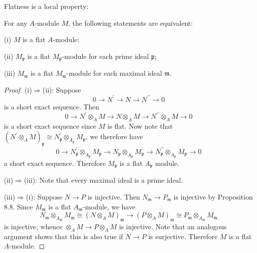 Flatness is a local property: 
\begin{proposition}
For any $A$-module $M$, the following statements are equivalent: \par
(i) $M$ is a flat $A$-module;\par
(ii) $M_\mathfrak{p}$ is a flat $M_\mathfrak{p}$-module for each prime ideal $\mathfrak{p}$;\par
(iii) $M_\mathfrak{m}$ is a flat $M_\mathfrak{m}$-module for each maximal ideal $\mathfrak{m}$.
\end{proposition}
\begin{proof}
(i)$\Rightarrow$(ii): Suppose 
$$
0\longrightarrow N^{\prime}\longrightarrow N\longrightarrow N^{\prime\prime}\longrightarrow 0
$$
is a short exact sequence. Then 
$$
0\longrightarrow N^{\prime}\otimes _AM\longrightarrow N\otimes _AM\longrightarrow N^{\prime\prime}\otimes _AM\longrightarrow 0
$$
is a short exact sequence since $M$ is flat. Now note that $\left( N^{\prime}\otimes _AM \right) _{\mathfrak{p}}\cong N_{\mathfrak{p}}^{\prime}\otimes _{A_{\mathfrak{p}}}M_{\mathfrak{p}}$, we therefore have 
$$
0\longrightarrow N_{\mathfrak{p}}^{\prime}\otimes _{A_{\mathfrak{p}}}M_{\mathfrak{p}}\longrightarrow N_{\mathfrak{p}}\otimes _{A_{\mathfrak{p}}}M_{\mathfrak{p}}\longrightarrow N_{\mathfrak{p}}^{\prime\prime}\otimes _{A_{\mathfrak{p}}}M_{\mathfrak{p}}\longrightarrow 0
$$
a short exact sequence. Therefore $M_\mathfrak{p}$ is a flat $A_\mathfrak{p}$ module.\par
(ii)$\Rightarrow$(iii): Note that every maximal ideal is a prime ideal.\par
(iii)$\Rightarrow$(i): Suppose $N\to P$ is injective. Then $N_\mathfrak{m}\to P_\mathfrak{m}$ is injective by Proposition 8.8. Since $M_\mathfrak{m}$ is a flat $A_\mathfrak{m}$-module, we have 
$$
N_{\mathfrak{m}}\otimes _{A_{\mathfrak{m}}}M_{\mathfrak{m}}\cong \left( N\otimes _AM \right) _{\mathfrak{m}}\rightarrow \left( P\otimes _AM \right) _{\mathfrak{m}}\cong P_{\mathfrak{m}}\otimes _{A_{\mathfrak{m}}}M_{\mathfrak{m}}
$$
is injective, whence $\otimes _AM\rightarrow P\otimes _AM$ is injective. Note that an analogous argument shows that this is also true if $N\to P$ is surjective. Therefore $M$ is a flat $A$-module.
\end{proof}
